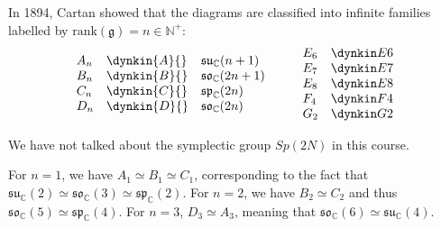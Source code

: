 In 1894, Cartan showed that the diagrams are classified into infinite families labelled by $\text{rank}(\mathfrak{g}) = n \in \mathbb{N}^+$:
\[ \begin{array}{lll}
    A_n & \dynkin{A}{} & \mathfrak{su}_{\mathbb{C}}(n+1) \\
    B_n & \dynkin{B}{} & \mathfrak{so}_{\mathbb{C}}(2n+1) \\
    C_n & \dynkin{C}{} & \mathfrak{sp}_{\mathbb{C}}(2n) \\
    D_n & \dynkin{D}{} & \mathfrak{so}_{\mathbb{C}}(2n) \\
  \end{array} \qquad
  \begin{array}{ll}
    \Dynk{E}{6} \\
    \Dynk{E}{7} \\
    \Dynk{E}{8} \\
    \Dynk{F}{4} \\
    \Dynk{G}{2} \\
  \end{array} \]
\begin{leftbar}
  \begin{note}
    We have not talked about the symplectic group $Sp(2N)$ in this course.
  \end{note}
\end{leftbar}
For $n = 1$, we have $A_1 \simeq B_1 \simeq C_1$, corresponding to the fact that $ \mathfrak{su}_{\mathbb{C}}(2) \simeq \mathfrak{so}_{\mathbb{C}}(3) \simeq \mathfrak{sp}_{\mathbb{C}}(2)$.
For $n = 2$, we have $B_2 \simeq C_2$  and thus $ \mathfrak{so}_{\mathbb{C}}(5) \simeq \mathfrak{sp}_{\mathbb{C}}(4)$.
For $n = 3$, $D_3 \simeq A_3$, meaning that $ \mathfrak{so}_{\mathbb{C}}(6) \simeq \mathfrak{su}_{\mathbb{C}}(4)$.
